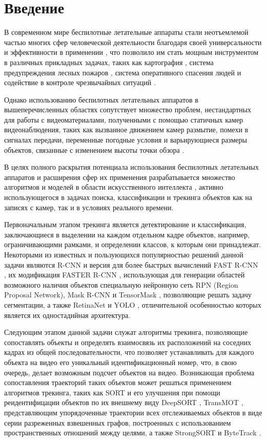 \section*{Введение}

В современном мире беспилотные летательные аппараты стали неотъемлемой частью многих сфер человеческой деятельности благодаря своей универсальности и эффективности в применении \cite{1-1}, что позволило им стать мощным инструментом в различных прикладных задачах, таких как картография \cite{1-2}, система предупреждения лесных пожаров \cite{1-3}, система оперативного спасения людей \cite{1-4} и содействие в контроле чрезвычайных ситуаций \cite{1-5}.

Однако использованию беспилотных летательных аппаратов в вышеперечисленных областях сопутствует множество проблем, нестандартных для работы с видеоматериалами, полученными с помощью статичных камер видеонаблюдения, таких как вызванное движением камер размытие, помехи в сигналах передачи, переменные погодные условия и варьирующиеся размеры объектов, связанные с изменением высоты точки обзора \cite{1-6}.

В целях полного раскрытия потенциала использования беспилотных летательных аппаратов и расширения сфер их применения разрабатывается множество алгоритмов и моделей в области искусственного интеллекта \cite{1-7}, активно использующегося в задачах поиска, классификации и трекинга объектов как на записях с камер, так и в условиях реального времени.

Первоначальным этапом трекинга является детектирование и классификация, заключающиеся в выделении на каждом отдельном кадре объектов, например, ограничивающими рамками, и определении классов, к которым они принадлежат. Некоторыми из известных и пользующихся популярностью решений данной задачи являются R-CNN \cite{1-8} и версия для более быстрых вычислений FAST R-CNN \cite{1-9}, их модификация FASTER R-CNN \cite{1-10}, использующая для генерации областей возможного наличия объектов специальную нейронную сеть RPN (Region Proposal Network), Mask R-CNN \cite{1-11} и TensorMask \cite{1-12}, позволяющие решать задачу сегментации, а также RetinaNet \cite{1-13} и YOLO \cite{1-14}, отличительной особенностью которых является их одностадийная архитектура.

Следующим этапом данной задачи служат алгоритмы трекинга, позволяющие сопоставлять объекты и определять взаимосвязь их расположений на соседних кадрах из общей последовательности, что позволяет устанавливать для каждого объекта на видео его уникальный идентификационный номер, что, в свою очередь, делает возможным подсчет объектов на видео. Возникающая проблема сопоставления траекторий таких объектов может решаться применением алгоритмов трекинга, таких как SORT \cite{1-15} и его улучшения при помощи реидентифицации объектов по их внешнему виду DeepSORT \cite{1-16}, TransMOT \cite{1-17}, представляющим упорядоченные траектории всех отслеживаемых объектов в виде серии разреженных взвешенных графов, построенных с использованием пространственных отношений между целями, а также StrongSORT \cite{1-18} и ByteTrack \cite{1-19}.

